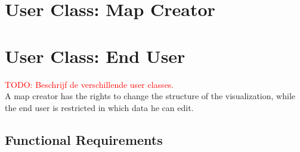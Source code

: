 \section{User Class: Map Creator}\label{sec:user-class-map-creator}

\section{User Class: End User}\label{sec:user-class-end-user}
\textcolor{red}{TODO: Beschrijf de verschillende user classes.}\\
A map creator has the rights to change the structure of the visualization, while the end user is restricted in which data he can edit.

\subsection{Functional Requirements}\label{sec:functional-requirements}

